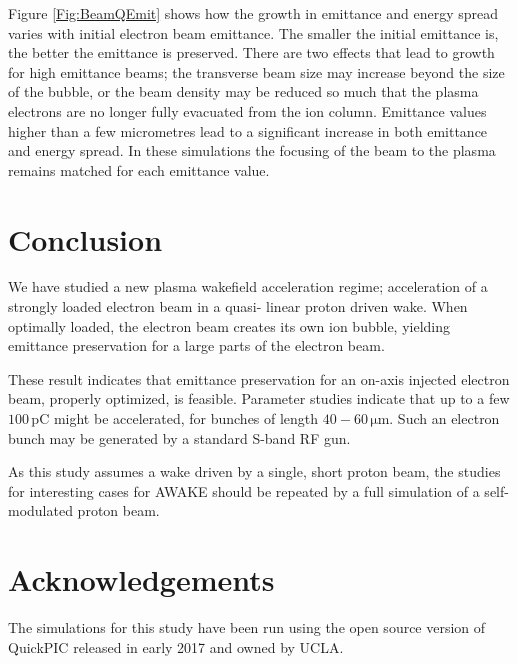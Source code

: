 \documentclass[aps,prstab,reprint,amsmath,amssymb,groupedaddress]{revtex4-1}
\newcommand{\unit}[1]{\,\mathrm{#1}}
\begin{document}
Figure \ref{Fig:BeamQEmit} shows how the growth in emittance and energy spread varies with initial electron beam
emittance. The smaller the initial emittance is, the better the emittance is preserved. There are two effects that lead
to growth for high emittance beams; the transverse beam size may increase beyond the size of the bubble, or the beam
density may be reduced so much that the plasma electrons are no longer fully evacuated from the ion column. Emittance
values higher than a few micrometres lead to a significant increase in both emittance and energy spread. In these
simulations the focusing of the beam to the plasma remains matched for each emittance value.

\section{Conclusion}\label{S:C}

We have studied a new plasma wakefield acceleration regime; acceleration of a strongly loaded electron beam in a quasi-
linear proton driven wake. When optimally loaded, the electron beam creates its own ion bubble, yielding emittance
preservation for a large parts of the electron beam.

These result indicates that emittance preservation for an on-axis injected electron beam, properly optimized, is
feasible. Parameter studies indicate that up to a few $100\unit{pC}$ might be accelerated, for bunches of length
$40-60\unit{\mu m}$. Such an electron bunch may be generated by a standard S-band RF gun.

As this study assumes a wake driven by a single, short proton beam, the studies for interesting cases for AWAKE should
be repeated by a full simulation of a self-modulated proton beam.

\section{Acknowledgements}\label{Ack}

The simulations for this study have been run using the open source version of QuickPIC released in early 2017 and owned
by UCLA.
\end{document}
